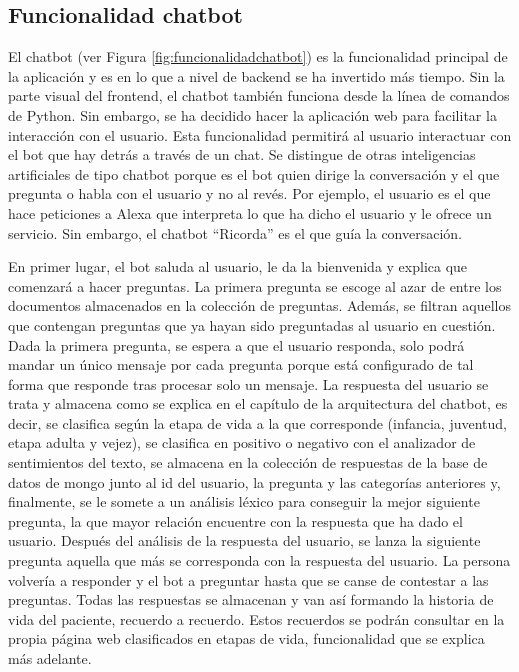 \subsection{Funcionalidad chatbot}

El chatbot (ver Figura \ref{fig:funcionalidadchatbot}) es la funcionalidad principal de la aplicación y es en lo que a nivel de backend se ha invertido más tiempo. Sin la parte visual del frontend, el chatbot también funciona desde la línea de comandos de Python. Sin embargo, se ha decidido hacer la aplicación web para facilitar la interacción con el usuario. Esta funcionalidad permitirá al usuario interactuar con el bot que hay detrás a través de un chat. Se distingue de otras inteligencias artificiales de tipo chatbot porque es el bot quien dirige la conversación y el que pregunta o habla con el usuario y no al revés. Por ejemplo, el usuario es el que hace peticiones a Alexa que interpreta lo que ha dicho el usuario y le ofrece un servicio. Sin embargo, el chatbot ``Ricorda'' es el que guía la conversación.

En primer lugar, el bot saluda al usuario, le da la bienvenida y explica que comenzará a hacer preguntas. La primera pregunta se escoge al azar de entre los documentos almacenados en la colección de preguntas. Además, se filtran aquellos que contengan preguntas que ya hayan sido preguntadas al usuario en cuestión. Dada la primera pregunta, se espera a que el usuario responda, solo podrá mandar un único mensaje por cada pregunta porque está configurado de tal forma que responde tras procesar solo un mensaje. La respuesta del usuario se trata y almacena como se explica en el capítulo de la arquitectura del chatbot, es decir, se clasifica según la etapa de vida a la que corresponde (infancia, juventud, etapa adulta y vejez), se clasifica en positivo o negativo con el analizador de sentimientos del texto, se almacena en la colección de respuestas de la base de datos de mongo junto al id del usuario, la pregunta y las categorías anteriores y, finalmente, se le somete a un análisis léxico para conseguir la mejor siguiente pregunta, la que mayor relación encuentre con la respuesta que ha dado el usuario. Después del análisis de la respuesta del usuario, se lanza la siguiente pregunta aquella que más se corresponda con la respuesta del usuario. La persona volvería a responder y el bot a preguntar hasta que se canse de contestar a las preguntas. Todas las respuestas se almacenan y van así formando la historia de vida del paciente, recuerdo a recuerdo. Estos recuerdos se podrán consultar en la propia página web clasificados en etapas de vida, funcionalidad que se explica más adelante.

